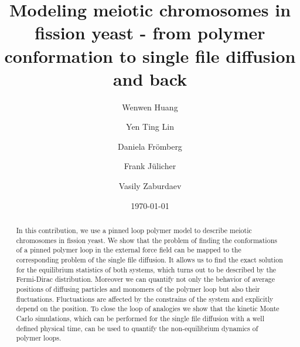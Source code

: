 \documentclass[preprint, aps, superscriptaddress]{revtex4-1}
\begin{document}
\title{Modeling meiotic chromosomes in fission yeast - from polymer conformation to single file diffusion and back}

\author{Wenwen Huang}
\author{Yen Ting Lin}
\author{Daniela Fr\"{o}mberg}
\author{Frank J\"{u}licher}
\author{Vasily Zaburdaev}

\date{\today}

\begin{abstract}
    In this contribution, we use a pinned loop polymer model to describe meiotic
    chromosomes in fission yeast. We show that the problem of finding the
    conformations of a pinned polymer loop in the external force field can be
    mapped to the corresponding problem of the single file diffusion. It allows
    us to find the exact solution for the equilibrium statistics of both
    systems, which turns out to be described by the Fermi-Dirac distribution.
    Moreover we can quantify not only the behavior of average positions of
    diffusing particles and monomers of the polymer loop but also their
    fluctuations. Fluctuations are affected by the constrains of the system and
    explicitly depend on the position. To close the loop of analogies we show
    that the kinetic Monte Carlo simulations, which can be performed for the
    single file diffusion with a well defined physical time, can be used to
    quantify the non-equilibrium dynamics of polymer loops.


\end{abstract}
\maketitle
\end{document}
